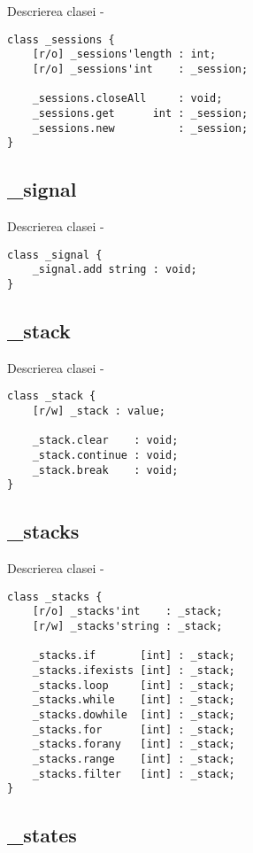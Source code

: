 \noindent Descrierea clasei  -
\begin{lstlisting}[numbers=none]
class _sessions {
	[r/o] _sessions'length : int;
	[r/o] _sessions'int    : _session;
	
	_sessions.closeAll     : void;
	_sessions.get      int : _session;
	_sessions.new          : _session;
}
\end{lstlisting}

\subsection{{\color{orange} \_signal}}

\noindent Descrierea clasei  -
\begin{lstlisting}[numbers=none]
class _signal {
	_signal.add string : void;
}
\end{lstlisting}

\subsection{{\color{orange} \_stack}}

\noindent Descrierea clasei  -
\begin{lstlisting}[numbers=none]
class _stack {
	[r/w] _stack : value;
	
	_stack.clear    : void;
	_stack.continue : void;
	_stack.break    : void;
}
\end{lstlisting}

\subsection{{\color{orange} \_stacks}}

\noindent Descrierea clasei  -
\begin{lstlisting}[numbers=none]
class _stacks {
	[r/o] _stacks'int    : _stack;
	[r/w] _stacks'string : _stack;
	
	_stacks.if       [int] : _stack;
	_stacks.ifexists [int] : _stack;
	_stacks.loop     [int] : _stack;
	_stacks.while    [int] : _stack;
	_stacks.dowhile  [int] : _stack;
	_stacks.for      [int] : _stack;
	_stacks.forany   [int] : _stack;
	_stacks.range    [int] : _stack;
	_stacks.filter   [int] : _stack;
}
\end{lstlisting}

\subsection{{\color{orange} \_states}}

